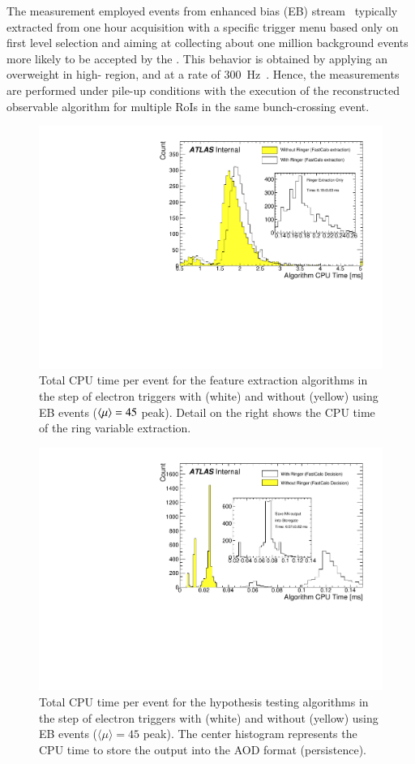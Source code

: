 The measurement employed events from enhanced bias (EB)
stream~\cite{eb_description} typically extracted from one hour acquisition with
a specific trigger menu based only on first level selection and aiming at
collecting about one million background events more likely to be accepted by the
\hlt{}. This behavior is obtained by applying an overweight in high-\pt{} region,
and at a rate of \SI{300}{\hertz}~\cite{eb_specifications}. Hence, the
measurements are performed under pile-up conditions with the execution of the
reconstructed observable algorithm for multiple RoIs in the same bunch-crossing event.


\begin{figure}[h!tb]
	\includegraphics[width=.7\textwidth]{sections/operation/figures/EgammaFex_TotalTime}
	\centering
	\caption{\label{fig:fastcalo_fex_time}
		Total CPU time per event for the feature extraction algorithms in the \fastcalo step of electron triggers with (white) and without (yellow) \rnn{} using EB events ($\langle \mu \rangle=45$ peak). Detail on the right shows the CPU time of the ring variable extraction.  
	}
\end{figure}

\begin{figure}[h!tb]
	\includegraphics[width=.7\textwidth]{sections/operation/figures/EgammaHypo_TotalTime.pdf}
	\centering
	\caption{\label{fig:fastcalo_hypo_time}
		Total CPU time per event for the hypothesis testing algorithms
		in the \fastcalo step of electron triggers with (white) and without (yellow) \rnn{} using EB events ($\langle \mu \rangle = 45$ peak). The center histogram represents the CPU time to store the \rnn{} output into the AOD format (persistence).}
\end{figure}

